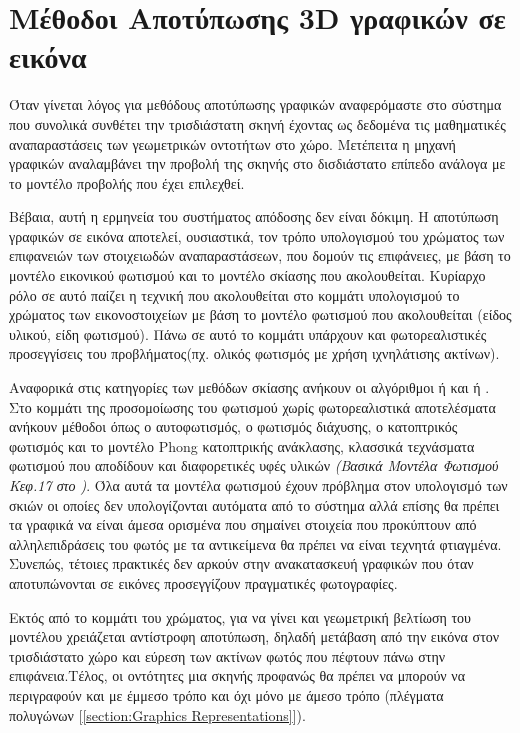 \section{Μέθοδοι Αποτύπωσης 3D γραφικών σε εικόνα}
\label{section:rendering}
\par 
    Όταν γίνεται λόγος για μεθόδους αποτύπωσης γραφικών αναφερόμαστε στο σύστημα που συνολικά συνθέτει την τρισδιάστατη σκηνή έχοντας ως δεδομένα τις μαθηματικές αναπαραστάσεις των γεωμετρικών οντοτήτων  στο χώρο. Μετέπειτα η μηχανή γραφικών αναλαμβάνει την προβολή της σκηνής στο δισδιάστατο επίπεδο ανάλογα με το μοντέλο προβολής που έχει επιλεχθεί.
\par
    Βέβαια, αυτή η ερμηνεία του συστήματος απόδοσης δεν είναι δόκιμη. Η αποτύπωση γραφικών σε εικόνα αποτελεί, ουσιαστικά, τον τρόπο υπολογισμού του χρώματος των επιφανειών των στοιχειωδών αναπαραστάσεων, που δομούν τις επιφάνειες, με βάση το μοντέλο εικονικού φωτισμού και το μοντέλο σκίασης που ακολουθείται. Κυρίαρχο ρόλο σε αυτό παίζει η τεχνική που ακολουθείται στο κομμάτι υπολογισμού το χρώματος των εικονοστοιχείων με βάση το μοντέλο φωτισμού που ακολουθείται (είδος υλικού, είδη φωτισμού). Πάνω σε αυτό το κομμάτι υπάρχουν και φωτορεαλιστικές προσεγγίσεις του προβλήματος(πχ. ολικός φωτισμός με χρήση ιχνηλάτισης ακτίνων).
\par
    Αναφορικά στις κατηγορίες των μεθόδων σκίασης ανήκουν οι αλγόριθμοι  ή  και  ή . Στο κομμάτι της προσομοίωσης του φωτισμού χωρίς φωτορεαλιστικά αποτελέσματα ανήκουν μέθοδοι όπως ο αυτοφωτισμός, ο φωτισμός διάχυσης, ο κατοπτρικός φωτισμός και το μοντέλο Phong κατοπτρικής ανάκλασης, κλασσικά τεχνάσματα φωτισμού που αποδίδουν και διαφορετικές υφές υλικών \textit{(Βασικά Μοντέλα Φωτισμού Κεφ.17 στο \cite{hearn2011computer})}. Όλα αυτά τα μοντέλα φωτισμού έχουν πρόβλημα στον υπολογισμό των σκιών οι οποίες δεν υπολογίζονται αυτόματα από το σύστημα αλλά επίσης θα πρέπει τα γραφικά να είναι άμεσα ορισμένα που σημαίνει στοιχεία που προκύπτουν από αλληλεπιδράσεις του φωτός με τα αντικείμενα θα πρέπει να είναι τεχνητά φτιαγμένα. Συνεπώς, τέτοιες πρακτικές δεν αρκούν στην ανακατασκευή γραφικών που όταν αποτυπώνονται σε εικόνες προσεγγίζουν πραγματικές φωτογραφίες. 
\par
    Εκτός από το κομμάτι του χρώματος, για να γίνει και γεωμετρική βελτίωση του μοντέλου χρειάζεται αντίστροφη αποτύπωση, δηλαδή μετάβαση από την εικόνα στον τρισδιάστατο χώρο και εύρεση των ακτίνων φωτός που πέφτουν πάνω στην επιφάνεια.Τέλος, οι οντότητες μια σκηνής προφανώς θα πρέπει να μπορούν να περιγραφούν και με έμμεσο τρόπο και όχι μόνο με άμεσο τρόπο (πλέγματα πολυγώνων [\ref{section:Graphics Representations}]). 
     
